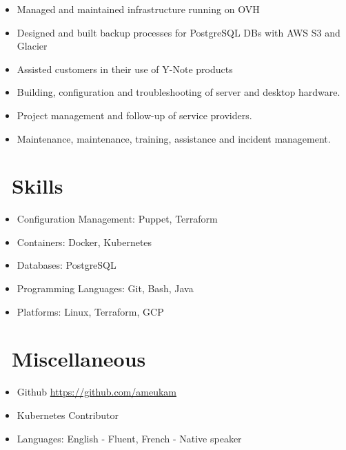 \documentclass{resume}
\begin{document}
\begin{itemize}
  \item Managed and maintained infrastructure running on OVH
  \item Designed and built backup processes for PostgreSQL DBs with AWS S3 and Glacier
  \item Assisted customers in their use of Y-Note products
\end{itemize}

\begin{itemize}
    \item Building, configuration and troubleshooting of server and desktop hardware.
    \item Project management and follow-up of service providers.
	\item Maintenance, maintenance, training, assistance and incident management.
\end{itemize}

\section{\faCogs\ Skills}
\begin{itemize}[parsep=0.5ex]
  \item Configuration Management: Puppet, Terraform
  \item Containers: Docker, Kubernetes
  \item Databases: PostgreSQL
  \item Programming Languages: Git, Bash, Java
  \item Platforms: Linux, Terraform, GCP
\end{itemize}

\section{\faInfo\ Miscellaneous}
\begin{itemize}[parsep=0.5ex]
  \item Github \url{https://github.com/ameukam}
  \item Kubernetes Contributor
  \item Languages: English - Fluent, French - Native speaker
\end{itemize}
\end{document}
